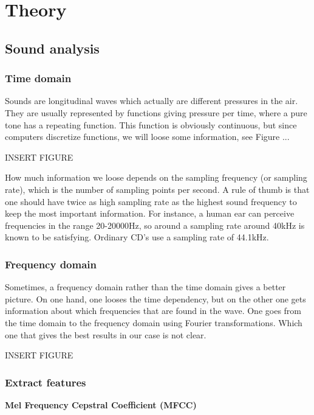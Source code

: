 \section{Theory} \label{sec:theory}

\subsection{Sound analysis}

\subsubsection{Time domain}
Sounds are longitudinal waves which actually are different pressures in the air. They are usually represented by functions giving pressure per time, where a pure tone has a repeating function. This function is obviously continuous, but since computers discretize functions, we will loose some information, see Figure ...

INSERT FIGURE

How much information we loose depends on the sampling frequency (or sampling rate), which is the number of sampling points per second. A rule of thumb is that one should have twice as high sampling rate as the highest sound frequency to keep the most important information. For instance, a human ear can perceive frequencies in the range 20-20000Hz, so around a sampling rate around 40kHz is known to be satisfying. Ordinary CD's use a sampling rate of 44.1kHz. 

\subsubsection{Frequency domain}
Sometimes, a frequency domain rather than the time domain gives a better picture. On one hand, one looses the time dependency, but on the other one gets information about which frequencies that are found in the wave. One goes from the time domain to the frequency domain using Fourier transformations. Which one that gives the best results in our case is not clear. 

INSERT FIGURE

\subsubsection{Extract features}
\textbf{Mel Frequency Cepstral Coefficient (MFCC)}

